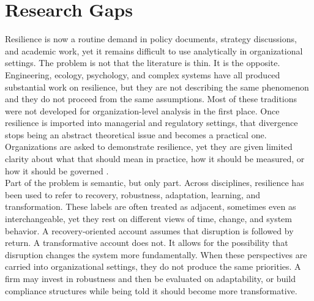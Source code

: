 \section{Research Gaps}
\label{sec:RG}

Resilience is now a routine demand in policy documents, strategy discussions, and academic work, yet it remains difficult to use analytically in organizational settings. The problem is not that the literature is thin. It is the opposite. Engineering, ecology, psychology, and complex systems have all produced substantial work on resilience, but they are not describing the same phenomenon and they do not proceed from the same assumptions. Most of these traditions were not developed for organization-level analysis in the first place. Once resilience is imported into managerial and regulatory settings, that divergence stops being an abstract theoretical issue and becomes a practical one. Organizations are asked to demonstrate resilience, yet they are given limited clarity about what that should mean in practice, how it should be measured, or how it should be governed \autocite{hillmann2021organizational}.\\

Part of the problem is semantic, but only part. Across disciplines, resilience has been used to refer to recovery, robustness, adaptation, learning, and transformation. These labels are often treated as adjacent, sometimes even as interchangeable, yet they rest on different views of time, change, and system behavior. A recovery-oriented account assumes that disruption is followed by return. A transformative account does not. It allows for the possibility that disruption changes the system more fundamentally. When these perspectives are carried into organizational settings, they do not produce the same priorities. A firm may invest in robustness and then be evaluated on adaptability, or build compliance structures while being told it should become more transformative.\\

